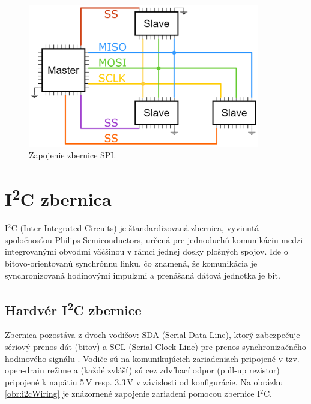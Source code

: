 \begin{figure}
    \centerline{\includegraphics[width=0.9\textwidth]{images/spiWiring.png}}
    \caption[Zapojenie zbernice SPI]{Zapojenie zbernice SPI.}
    \label{obr:spiWiring}
\end{figure}

\section{I\textsuperscript{2}C zbernica}
I$^2$C (Inter-Integrated Circuits) je štandardizovaná zbernica, vyvinutá spoločnosťou Philips Semiconductors, určená pre jednoduchú komunikáciu medzi integrovanými obvodmi \cite{i2cSpec} väčšinou v rámci jednej dosky plošných spojov. Ide o bitovo-orientovanú synchrónnu linku, čo znamená, že komunikácia je synchronizovaná hodinovými impulzmi a prenášaná dátová jednotka je bit.

\subsection{Hardvér I\textsuperscript{2}C zbernice}
Zbernica pozostáva z dvoch vodičov: SDA (Serial Data Line), ktorý zabezpečuje sériový prenos dát (bitov) a SCL (Serial Clock Line) pre prenos synchronizačného hodinového signálu \cite{i2cSpec}. Vodiče sú na komunikujúcich zariadeniach pripojené v tzv. open-drain režime a (každé zvlášť) sú cez zdvíhací odpor (pull-up rezistor) pripojené k napätiu 5\,V resp. 3.3\,V v závislosti od konfigurácie. Na obrázku \ref{obr:i2cWiring} je znázornené zapojenie zariadení pomocou zbernice I$^2$C.

